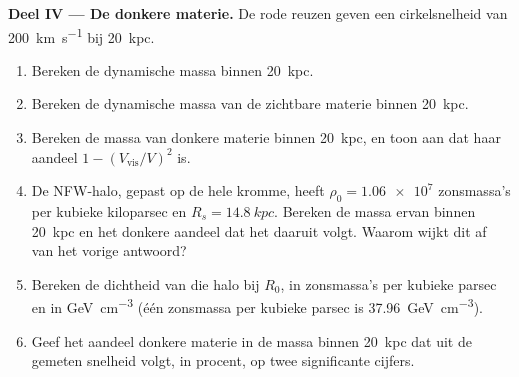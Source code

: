 \begin{problem}
\medskip\noindent\textbf{Deel IV --- De donkere materie.} De rode reuzen
geven een cirkelsnelheid van \qty{200}{km.s^{-1}} bij \qty{20}{kpc}.
\begin{enumerate}[resume]
\item Bereken de dynamische massa binnen \qty{20}{kpc}.
\item Bereken de dynamische massa van de zichtbare materie binnen
  \qty{20}{kpc}.
\item Bereken de massa van donkere materie binnen \qty{20}{kpc}, en toon aan dat
  haar aandeel $1 - (V_\mathrm{vis}/V)^2$ is.
\item De NFW-halo, gepast op de hele kromme, heeft
  $\rho_0 = \num{1.06e7}$ zonsmassa's per kubieke kiloparsec en
  $R_s = \qty{14.8}{kpc}$. Bereken de massa ervan binnen \qty{20}{kpc} en het
  donkere aandeel dat het daaruit volgt. Waarom wijkt dit af van het vorige antwoord?
\item Bereken de dichtheid van die halo bij $R_0$, in zonsmassa's per
  kubieke parsec en in \unit{GeV.cm^{-3}} (één zonsmassa per kubieke parsec
  is \qty{37.96}{GeV.cm^{-3}}).
\item Geef het aandeel donkere materie in de massa binnen \qty{20}{kpc}
  dat uit de gemeten snelheid volgt, in procent, op twee
  significante cijfers.
\end{enumerate}
\end{problem}
